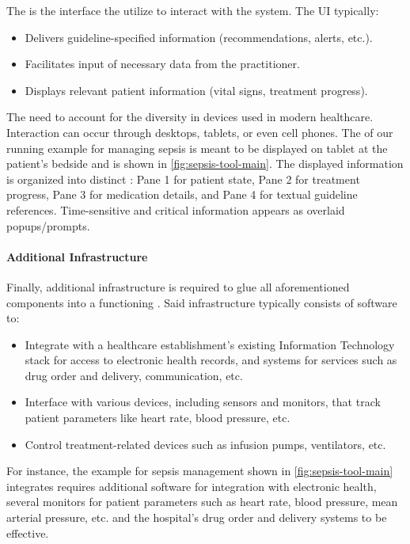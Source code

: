 The \UI{} is the interface the \HCPs{} utilize to interact with the system.
The UI typically:
\begin{itemize}
  \item Delivers guideline-specified information (recommendations, alerts, etc.).
  \item Facilitates input of necessary data from the practitioner.
  \item Displays relevant patient information (vital signs, treatment progress).
\end{itemize}

The \UIs{} need to account for the diversity in devices used in modern
healthcare. Interaction can occur through desktops, tablets, or even cell
phones. The \UI{} of our running example \CDSS{} for managing sepsis
is meant to be displayed on tablet at the patient's bedside and is shown in
\autoref{fig:sepsis-tool-main}.
The displayed information is organized into distinct :
Pane 1 for patient state, Pane 2 for treatment progress,
Pane 3 for medication details, and Pane 4 for textual guideline references.
Time-sensitive and critical information appears as overlaid popups/prompts.

\paragraph{Additional Infrastructure}

Finally, additional infrastructure is required to glue all aforementioned
components into a functioning \CDSS{}. Said infrastructure typically consists
of software to:
\begin{itemize}
  \item Integrate with a healthcare establishment's existing Information Technology
    stack for access to electronic health records, and systems for services such
    as drug order and delivery, \HCP{} communication, etc.
  \item Interface with various devices, including sensors and monitors,
    that track patient parameters like heart rate, blood pressure, etc.
  \item Control treatment-related devices such as infusion pumps, ventilators, etc.
\end{itemize}
For instance, the example \CDSS{} for sepsis management shown in
\autoref{fig:sepsis-tool-main} integrates requires additional software for integration with
electronic health, several monitors for patient parameters
such as heart rate, blood pressure, mean arterial pressure, etc. and the
hospital's drug order and delivery systems to be effective.

